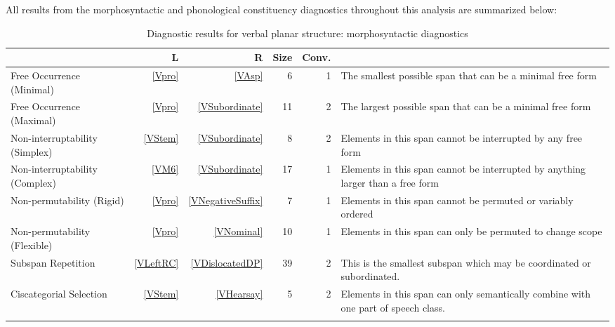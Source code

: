 \documentclass[output=paper]{langscibook}
\begin{document}
All results from the morphosyntactic and phonological constituency diagnostics throughout this analysis are summarized below:

    \begin{table}
    \caption{Diagnostic results for verbal planar structure: morphosyntactic diagnostics}
    \label{tab:verbresults}
      \begin{tabularx}{\textwidth}{>{\raggedright}p{4cm}rrrrQ}
        \lsptoprule
        & L & R & Size & Conv. & \\ \midrule
        Free Occurrence (Minimal) & \ref{Vpro} & \ref{VAsp} & 6 & 1 & The smallest possible span that can be a minimal free form  \\
        Free Occurrence (Maximal) & \ref{Vpro} & \ref{VSubordinate} & 11 & 2 & The largest possible span that can be a minimal free form  \\
        Non-interruptability (Simplex) & \ref{VStem} & \ref{VSubordinate} & 8 & 2 & Elements in this span cannot be interrupted by any free form \\
        Non-interruptability (Complex) & \ref{VM6} & \ref{VSubordinate} & 17 & 1 &  Elements in this span cannot be interrupted by anything larger than a free form \\
        Non-permutability (Rigid) & \ref{Vpro} & \ref{VNegativeSuffix} & 7 & 1 &  Elements in this span cannot be permuted or variably ordered \\
        Non-permutability (Flexible) & \ref{Vpro} & \ref{VNominal} & 10 & 1 & Elements in this span can only be permuted to change scope \\
        Subspan Repetition & \ref{VLeftRC} & \ref{VDislocatedDP} & 39 & 2 & This is the smallest subspan which may be coordinated or subordinated. \\
        Ciscategorial Selection & \ref{VStem} & \ref{VHearsay} & 5 & 2 &  Elements in this span can only semantically combine with one part of speech class. \\
        \lspbottomrule
        \end{tabularx}
        \end{table}
\end{document}
